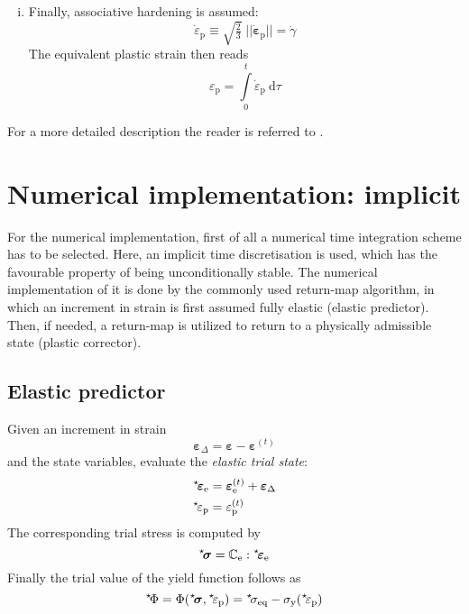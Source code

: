 \documentclass[namecite, fleqn]{goose-article}
\newcommand\leftstar[1]{\hspace*{-.3em}~^\star\!#1}
\begin{document}
\begin{enumerate}[(i)]
    \item Finally, associative hardening is assumed:
    \begin{equation}
        \dot{\varepsilon}_\mathrm{p}
        \equiv \sqrt{\tfrac{2}{3}} \; \big|\big| \dot{\bm{\varepsilon}}_\mathrm{p} \big|\big|
        = \dot{\gamma}
    \end{equation}
    The equivalent plastic strain then reads
    \begin{equation}
        \varepsilon_\mathrm{p}
        = \int\limits_0^t \dot{\varepsilon}_\mathrm{p} ~\mathrm{d}\tau
    \end{equation}

\end{enumerate}
For a more detailed description the reader is referred to \citet[][p.\ 216-234]{DeSouzaNeto2008}.

\section{Numerical implementation: implicit}

For the numerical implementation, first of all
a numerical time integration scheme has to be selected.
Here, an implicit time discretisation is used, which has the
favourable property of being unconditionally stable.
The numerical implementation of it is done by the commonly used return-map algorithm,
in which an increment in strain is first assumed fully elastic (elastic predictor).
Then, if needed, a return-map is utilized to return to a physically admissible state
(plastic corrector).

\subsection{Elastic predictor}

Given an increment in strain
\begin{equation}
    \bm{\varepsilon}_\Delta
    = \bm{\varepsilon} - \bm{\varepsilon}^{(t)}
\end{equation}
and the state variables, evaluate the \emph{elastic trial state}:
\begin{align}
    \leftstar{\bm{\varepsilon}}_\mathrm{e}
    &= \bm{\varepsilon}_\mathrm{e}^{(t)} + \bm{\varepsilon}_\Delta
    \\
    \leftstar{\varepsilon}_\mathrm{p}
    &= \varepsilon_\mathrm{p}^{(t)}
\end{align}
The corresponding trial stress is computed by
\begin{equation}
    \leftstar{\bm{\sigma}}
    = \mathbb{C}_\mathrm{e} : \leftstar{\bm{\varepsilon}}_\mathrm{e}
\end{equation}
Finally the trial value of the yield function follows as
\begin{equation}
    \leftstar{\Phi}
    = \Phi( \leftstar{\bm{\sigma}} , \leftstar{\varepsilon}_\mathrm{p} )
    = \leftstar{\sigma}_\mathrm{eq}
    - \sigma_\mathrm{y} (\leftstar{\varepsilon}_\mathrm{p})
\end{equation}
\end{document}
